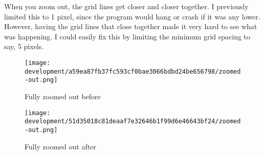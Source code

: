 \documentclass[../development.tex]{subfiles}
\begin{document}
When you zoom out, the grid lines get closer and closer together. I previously limited this to 1 pixel, since the program would hang or crash if it was any lower. However, having the grid lines that close together made it very hard to see what was happening. I could easily fix this by limiting the minimum grid spacing to say, 5 pixels.

\begin{figure}[H]
	\centering
	\begin{minipage}{0.48\linewidth}
		\centering
		\texttt{[image: development/a59ea87fb37fc593cf0bae3066bdbd24be656798/zoomed-out.png]}
		\caption{Fully zoomed out before}
		\label{fig:development:a59ea87fb37fc593cf0bae3066bdbd24be656798:zoomed-out.png}
	\end{minipage}\hfill
	\begin{minipage}{0.48\linewidth}
		\centering
		\texttt{[image: development/51d35018c81deaaf7e32646b1f99d6e46643bf24/zoomed-out.png]}
		\caption{Fully zoomed out after}
		\label{fig:development:51d35018c81deaaf7e32646b1f99d6e46643bf24:zoomed-out.png}
	\end{minipage}
\end{figure}

\end{document}
